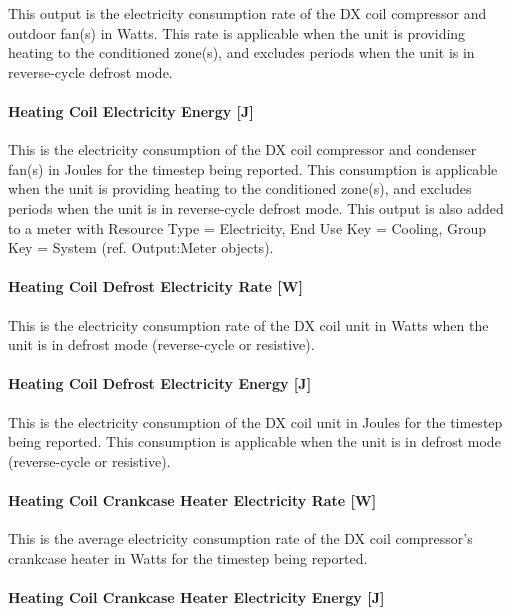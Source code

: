 This output is the electricity consumption rate of the DX coil compressor and outdoor fan(s) in Watts. This rate is applicable when the unit is providing heating to the conditioned zone(s), and excludes periods when the unit is in reverse-cycle defrost mode.

\paragraph{Heating Coil Electricity Energy {[}J{]}}\label{heating-coil-electric-energy-j-3}

This is the electricity consumption of the DX coil compressor and condenser fan(s) in Joules for the timestep being reported. This consumption is applicable when the unit is providing heating to the conditioned zone(s), and excludes periods when the unit is in reverse-cycle defrost mode. This output is also added to a meter with Resource Type = Electricity, End Use Key = Cooling, Group Key = System (ref. Output:Meter objects).

\paragraph{Heating Coil Defrost Electricity Rate {[}W{]}}\label{heating-coil-defrost-electric-power-w}

This is the electricity consumption rate of the DX coil unit in Watts when the unit is in defrost mode (reverse-cycle or resistive).

\paragraph{Heating Coil Defrost Electricity Energy {[}J{]}}\label{heating-coil-defrost-electric-energy-j}

This is the electricity consumption of the DX coil unit in Joules for the timestep being reported. This consumption is applicable when the unit is in defrost mode (reverse-cycle or resistive).

\paragraph{Heating Coil Crankcase Heater Electricity Rate {[}W{]}}\label{heating-coil-crankcase-heater-electric-power-w}

This is the average electricity consumption rate of the DX coil compressor's crankcase heater in Watts for the timestep being reported.

\paragraph{Heating Coil Crankcase Heater Electricity Energy {[}J{]}}\label{heating-coil-crankcase-heater-electric-energy-j}

